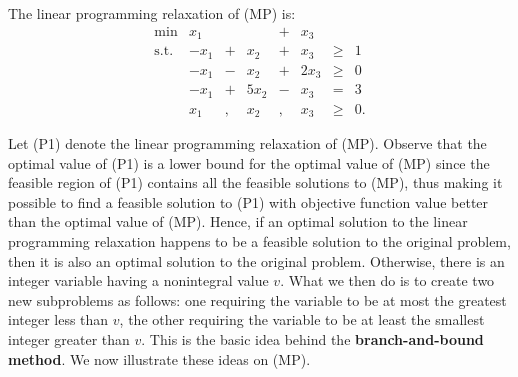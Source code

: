 \documentclass[]{book}
\theoremstyle{definition}
\theoremstyle{definition}
\theoremstyle{remark}
\begin{document}
The linear programming relaxation of (MP) is: \[\begin{array}{rrcrcrlll}
\mbox{min} & x_1 &  &  & + & x_3  \\
\text{s.t.} & -x_1 & + &  x_2 & + &  x_3  & \geq & 1 \\
& -x_1 & - &  x_2 & + & 2x_3  & \geq & 0 \\
& -x_1 & + & 5x_2 & - &  x_3  & = & 3 \\
&  x_1 & , & x_2 & , & x_3 & \geq & 0.
\end{array}\]

Let (P1) denote the linear programming relaxation of (MP). Observe that
the optimal value of (P1) is a lower bound for the optimal value of (MP)
since the feasible region of (P1) contains all the feasible solutions to
(MP), thus making it possible to find a feasible solution to (P1) with
objective function value better than the optimal value of (MP). Hence,
if an optimal solution to the linear programming relaxation happens to
be a feasible solution to the original problem, then it is also an
optimal solution to the original problem. Otherwise, there is an integer
variable having a nonintegral value \(v\). What we then do is to create
two new subproblems as follows: one requiring the variable to be at most
the greatest integer less than \(v\), the other requiring the variable
to be at least the smallest integer greater than \(v\). This is the
basic idea behind the \textbf{branch-and-bound method}. We now
illustrate these ideas on (MP).
\end{document}
